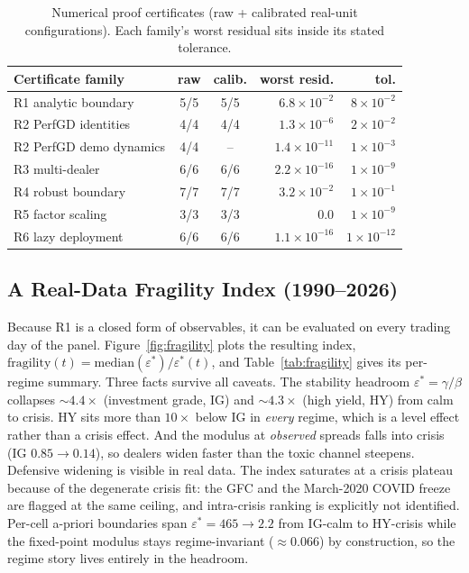 \documentclass[sigconf]{acmart}
\newcommand{\eps}{\varepsilon}
\begin{document}
\begin{table}[t]
\caption{Numerical proof certificates (raw + calibrated real-unit
configurations). Each family's worst residual sits inside its stated
tolerance.}
\label{tab:certs}
\small
\begin{tabular}{@{}lccrr@{}}
\toprule
Certificate family & raw & calib. & worst resid. & tol. \\
\midrule
R1 analytic boundary        & 5/5 & 5/5 & $6.8{\times}10^{-2}$ & $8{\times}10^{-2}$ \\
R2 PerfGD identities        & 4/4 & 4/4 & $1.3{\times}10^{-6}$ & $2{\times}10^{-2}$ \\
R2 PerfGD demo dynamics     & 4/4 & --  & $1.4{\times}10^{-11}$ & $1{\times}10^{-3}$ \\
R3 multi-dealer             & 6/6 & 6/6 & $2.2{\times}10^{-16}$ & $1{\times}10^{-9}$ \\
R4 robust boundary          & 7/7 & 7/7 & $3.2{\times}10^{-2}$ & $1{\times}10^{-1}$ \\
R5 factor scaling           & 3/3 & 3/3 & $0.0$                & $1{\times}10^{-9}$ \\
R6 lazy deployment          & 6/6 & 6/6 & $1.1{\times}10^{-16}$ & $1{\times}10^{-12}$ \\
\bottomrule
\end{tabular}
\end{table}

\subsection{A Real-Data Fragility Index (1990--2026)}
\label{sec:fragility}
Because R1 is a closed form of observables, it can be evaluated on every
trading day of the panel. Figure~\ref{fig:fragility} plots the resulting
index, $\mathrm{fragility}(t)=\mathrm{median}(\eps^*)/\eps^*(t)$, and
Table~\ref{tab:fragility} gives its per-regime summary. Three facts survive
all caveats. The stability headroom $\eps^*=\gamma/\beta$ collapses
${\sim}4.4\times$ (investment grade, IG) and ${\sim}4.3\times$ (high yield,
HY) from calm to crisis. HY sits more than $10\times$ below IG in
\emph{every} regime, which is a level effect rather than a crisis effect.
And the modulus at \emph{observed} spreads falls into crisis (IG
$0.85\to0.14$), so dealers widen faster than the toxic channel steepens.
Defensive widening is visible in real data. The index saturates at a crisis
plateau because of the degenerate crisis fit: the GFC and the March-2020
COVID freeze are flagged at the same ceiling, and intra-crisis ranking is
explicitly not identified. Per-cell a-priori boundaries span
$\eps^*=465\to2.2$ from IG-calm to HY-crisis while the fixed-point modulus
stays regime-invariant (${\approx}0.066$) by construction, so the regime
story lives entirely in the headroom.
\end{document}
